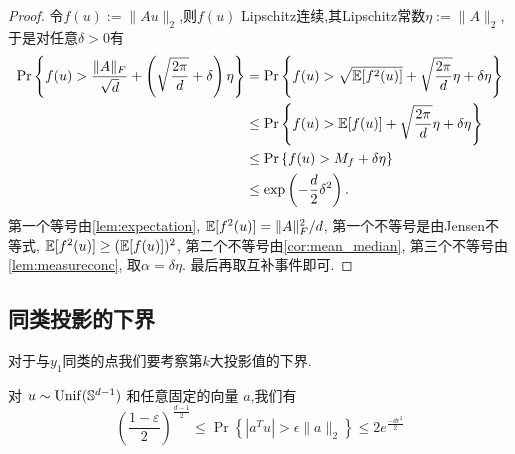 \begin{proof}
  令\(f(u):=\|Au\|_2\),则\(f(u)\) Lipschitz连续,其Lipschitz常数\(\eta:=\|A\|_2\),
  于是对任意\(\delta>0\)有
  \begin{align*}
    \Pr \left\{ f(u) > \frac{\|A\|_F}{\sqrt{d}} + 
    \left (\sqrt{\frac{2\pi}{d}}+\delta\right)\eta\right\} &=
    \Pr \left\{ f(u) > \sqrt{\mathbb{E}[f^2(u)]}+
    \sqrt{\frac{2\pi}{d}}\eta+\delta\eta\right\} \\
    &\le \Pr \left\{ f(u) > \mathbb{E}[f(u)] +
    \sqrt{\frac{2\pi}{d}}\eta+\delta\eta\right\} \\
    &\le \Pr \left\{ f(u) > M_f+\delta\eta \right\}\\
    &\le \exp\left( -\frac{d}{2}\delta^2 \right).
  \end{align*}
  第一个等号由\autoref{lem:expectation},  \(\mathbb{E}[f^2(u)]= \|A\|_F^2/d\),
  第一个不等号是由Jensen不等式, \(\mathbb{E}[f^2(u)]\ge (\mathbb{E}[f(u)])^2\),
  第二个不等号由\autoref{cor:mean_median}, 第三个不等号由\autoref{lem:measureconc}, 
  取\(\alpha=\delta\eta\). 最后再取互补事件即可.
\end{proof}

\subsection{同类投影的下界}
对于与\(y_1\)同类的点我们要考察第\(k\)大投影值的下界.
\begin{lemma}\label{lem:spherical_cap}
  对 \(u \sim \operatorname{Unif}(\mathbb{S}^{d-1})\) 和任意固定的向量 \(a\),我们有
  \begin{equation*}
    \left( \frac{1-\varepsilon}{2} \right)^{\frac{d-1}{2}} \le
    \Pr\left\{|a^Tu|>\epsilon \|a\|_2\right\} \le 2e^{\frac{-d\epsilon^2}{2}}
  \end{equation*}
\end{lemma}

